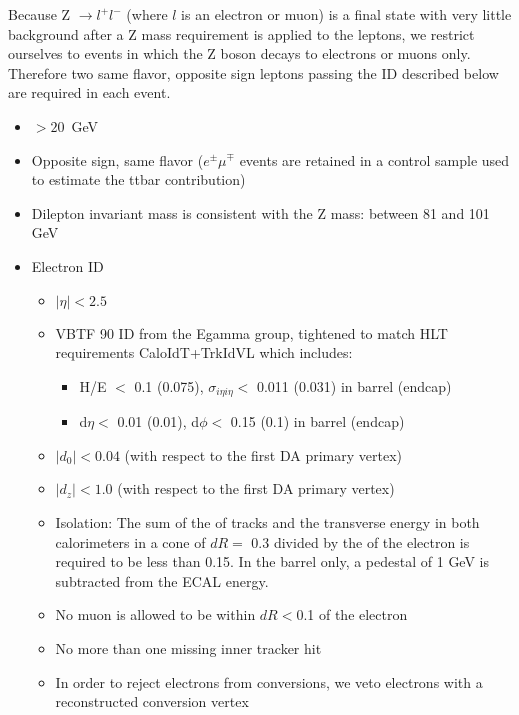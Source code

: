 Because Z $\rightarrow l^+l^-$ (where $l$ is an electron or muon) is a final state with very little 
background after a Z mass requirement is applied to the leptons,
we restrict ourselves to events in which the Z boson decays to electrons or muons only.
Therefore two same flavor, opposite sign leptons passing the ID described below are required in each event.

\begin{itemize}
\item \pt $> 20$~GeV
\item Opposite sign, same flavor ($e^\pm\mu^\mp$ events are retained in a control 
  sample used to estimate the ttbar contribution)
\item Dilepton invariant mass is consistent with the Z mass: between 81 and 101 GeV


\item Electron ID
  \begin{itemize}
  \item $|\eta| < 2.5$
  \item VBTF 90 ID from the Egamma group\cite{ref:vbtf}, 
	tightened to match HLT requirements CaloIdT+TrkIdVL which includes: \cite{ref:eghlt}
	\begin{itemize}
	\item H/E $<$ 0.1 (0.075), $\sigma_{i\eta i\eta} <$ 0.011 (0.031) in barrel (endcap)
	\item d$\eta <$ 0.01 (0.01), d$\phi <$ 0.15 (0.1) in barrel (endcap)
	\end{itemize}
  \item $|d_0| <0.04$ (with respect to the first DA primary vertex)
  \item $|d_z| <1.0$ (with respect to the first DA primary vertex)
  \item Isolation: The sum of the \pt of tracks and the transverse energy in both calorimeters in a cone of $dR =$ 0.3 divided by the \pt of the electron is required to be less than 0.15. In the barrel only, a pedestal of 1 GeV is subtracted from the ECAL energy.
  \item No muon is allowed to be within $dR < $0.1 of the electron
  \item No more than one missing inner tracker hit \cite{ref:sntconv}
  \item In order to reject electrons from conversions, we veto electrons with a reconstructed conversion vertex \cite{ref:borisconv}


\end{itemize}
\end{itemize}
